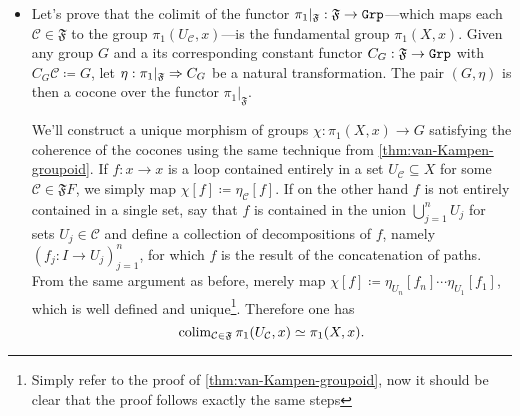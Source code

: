 \begin{itemize}\setlength\itemsep{0em}
    \item Let's prove that the colimit of the functor
          \(\pi_1|_{\mathfrak{F}}: \mathfrak{F} \to {\texttt{Grp}}\)---which maps each
          \(\mathcal{C} \in \mathfrak{F}\) to the group
          \(\pi_1(U_{\mathcal{C}}, x)\)---is the fundamental group \(\pi_1(X,
          x)\). Given any group \(G\) and a its corresponding constant functor
          \(C_G: \mathfrak{F} \to {\texttt{Grp}}\) with \(C_G \mathcal{C} \coloneq G\), let
          \(\eta: \pi_1|_{\mathfrak{F}} \Rightarrow C_G\) be a natural transformation. The pair
          \((G, \eta)\) is then a cocone over the functor \(\pi_1|_{\mathfrak F}\).

          We'll construct a unique morphism of groups \(\chi: \pi_1(X, x) \to G\)
          satisfying the coherence of the cocones using the same technique from
          \cref{thm:van-Kampen-groupoid}. If \(f: x \to x\) is a loop contained entirely
          in a set \(U_{\mathcal{C}} \subseteq X\) for some
          \(\mathcal{C} \in \mathfrak{F} F\), we simply map
          \(\chi [f] \coloneq \eta_{\mathcal{C}} [f]\). If on the other hand \(f\) is
          not entirely contained in a single set, say that \(f\) is contained in the
          union \(\bigcup_{j=1}^n U_j\) for sets \(U_j \in \mathcal{C}\) and define a
          collection of decompositions of \(f\), namely \((f_j: I \to U_j)_{j=1}^n\),
          for which \(f\) is the result of the concatenation of paths. From the same
          argument as before, merely map
          \(\chi [f] \coloneq \eta_{U_n} [f_n] \cdots \eta_{U_1} [f_1]\), which is well
          defined and unique\footnote{Simply refer to the proof of
              \cref{thm:van-Kampen-groupoid}, now it should be clear that the proof
              follows exactly the same steps}. Therefore one has
          \begin{equation}\label{eq:van-kampen-grp-2}
              \operatorname{colim}_{\mathcal{C} \in \mathfrak{F}} \pi_1(U_{\mathcal{C}}, x) \simeq \pi_1(X, x).
          \end{equation}


\end{itemize}
